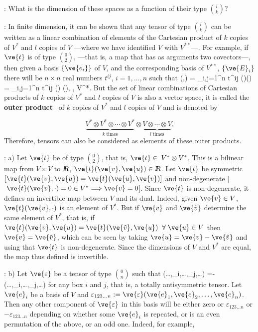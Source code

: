 \ejer: What is the dimension of these spaces as a function of their type ${l \choose k}$?

\noi{}:
In finite dimension, it can be shown that any tensor of type ${l \choose k}$
can be written as a linear combination of elements of the Cartesian product of $k$ copies of $V^*$ and $l$ copies of $V$ 
---where we have identified $V$ with $V^{**}$---. 
For example, if $\ve{t}$ is of type ${0 \choose 2}$, ---that is, a map that has as arguments two covectors---, 
then given a basis $\{\ve{e_{i}}\}$ of $V$, and the corresponding basis of $V^{**}$, $\{\ve{E}_{i}\}$ there will be $n \times n$ real numbers $t^{ij}$, $i=1, \ldots ,n$ such that 
\beq
{}(\ve{\sigma},\ve{\omega}) = 
\sum_{i,j=1}^{n} t^{ij} (\ve{\sigma})(\ve{\omega})
=
\sum_{i,j=1}^{n} t^{ij} \ve{\sigma}() \ve{\omega}(), 
\;\;\;\; \forall \ve{\sigma},\;\ve{\omega} \in V^*.
\eeq
%
But the set of linear combinations of Cartesian products of
$k$ copies of $V^*$ and $l$ copies of $V$ is also a vector
space, it is called the {\bf outer product}~ 
of  $k$ copies of $V^*$ and $l$ copies of $V$ and is denoted by 

\[
\underbrace{V^*\otimes V^*\otimes\cdots\otimes V^*}_{k\;\mbox{times}}
\otimes\underbrace{ V\otimes \cdots\otimes V}_{l\;\mbox{times}}.
\]
%
Therefore, tensors can also be considered as elements
of these outer products.

\ejem: a) Let $\ve{ t}$ be of type ${0 \choose 2}$, that is, $\ve{ t}\in\;V^*\otimes V^*$. 
This is a bilinear map from $V\times V$ to $\mbox{\sl {l$\!\!\!\;\:\!$R}}$, $\ve{ t}(\ve{v},\ve{u})\in \re$. Let
$\ve{ t}$ be symmetric $[\ve{ t}(\ve{v},\ve{u})=\ve{ t}(\ve{u},\ve{v})]$ and non-degenerate 
[$\; \ve{ t}(\ve{v},\cdot)= 0
\in V^*\Longrightarrow \ve{v}=0$]. 
Since $\ve{ t}$ is non-degenerate, it defines an invertible map between $V$ and its dual. 
Indeed, given $\ve{v} \in V$, $\ve{t}(\ve{v},\cdot)$ is an element of $V^*$. 
But if $\ve{v}$ and $\ve{\tilde{v}}$ determine the same element of $V^*$, that is, if $\ve{ t}(\ve{v},\ve{u}) = \ve{ t}(\ve{\tilde{v}},\ve{u}) \;\; \forall \; \ve{u} \in V$ then $\ve{v}=\ve{\tilde{v}}$, which can be seen by taking $\ve{u} = \ve{v} - \ve{\tilde{v}}$ and using that $\ve{t}$ is non-degenerate. Since the dimensions of $V$ and $V^{*}$ are equal, the map thus defined is invertible.

\ejem: b) Let $\ve{\varepsilon}$ be a tensor of type ${0 \choose n}$ such that \beq \ve{\varepsilon} (\ldots,_i,\ldots,_j,\ldots) =-\ve{\varepsilon} (\ldots,_i,\ldots,_j,\ldots) \eeq \noi for any box $i$ and $j$, that is, a totally antisymmetric tensor. Let ${\ve{e}_i}$ be a basis of $V$ and $\varepsilon_{123\ldots n}:= \ve{\varepsilon} (\ve{e}_1,\ve{e}_2,\ldots,\ve{e}_n)$. Then any other component of $\ve{\varepsilon}$ in this basis will be either zero or $\varepsilon_{123\ldots n}$ or $-\varepsilon_{123\ldots n}$ depending on whether some $\ve{e}_i$ is repeated, or is an even permutation of the above, or an odd one. Indeed, for example,

